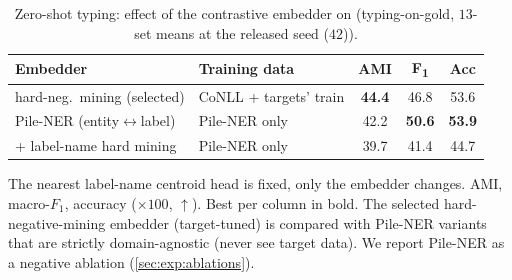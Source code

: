 \begin{table}[tbp]
\centering
\caption{Zero-shot typing: effect of the contrastive embedder on \zsind (typing-on-gold, $13$-set means at the released seed ($42$)).}
\label{tab:zs-embedder}
\small
\begin{threeparttable}
\begin{tabular}{llccc}
\toprule
Embedder & Training data & AMI & F\textsubscript{1} & Acc \\
\midrule
hard-neg.\ mining (selected) & CoNLL + targets' train & \textbf{44.4} & 46.8 & 53.6 \\
Pile-NER (entity$\leftrightarrow$label) & Pile-NER only & 42.2 & \textbf{50.6} & \textbf{53.9} \\
\quad + label-name hard mining & Pile-NER only & 39.7 & 41.4 & 44.7 \\
\bottomrule
\end{tabular}
\begin{tablenotes}[flushleft]
\footnotesize
\item The nearest label-name centroid head is fixed, only the embedder changes. AMI, macro-$F_1$, accuracy ($\times100$, $\uparrow$). Best per column in bold. The selected hard-negative-mining embedder (target-tuned) is compared with Pile-NER \cite{zhou2024universalner} variants that are strictly domain-agnostic (never see target data). We report Pile-NER as a negative ablation (\autoref{sec:exp:ablations}).
\end{tablenotes}
\end{threeparttable}
\end{table}

\FloatBarrier



